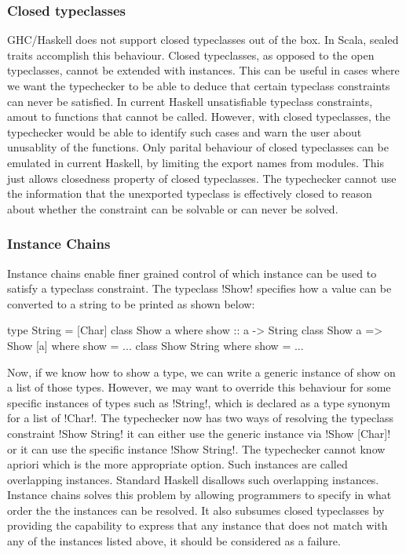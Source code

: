 \documentclass[manuscript,screen,nonacm]{acmart}
\begin{document}
\subsubsection{Closed typeclasses}
GHC/Haskell does not support closed typeclasses out of the box. In Scala, sealed traits accomplish this behaviour. Closed typeclasses, as opposed to the open typeclasses, cannot be extended with instances. This can be useful in cases where we want the typechecker to be able to deduce that certain typeclass constraints can never be satisfied. In current Haskell unsatisfiable typeclass constraints, amout to functions that cannot be called. However, with closed typeclasses, the typechecker would be able to identify such cases and warn the user about unusablity of the functions. Only parital behaviour of closed typeclasses can be emulated in current Haskell, by limiting the export names from modules. This just allows closedness property of closed typeclasses. The typechecker cannot use the information that the unexported typeclass is effectively closed to reason about whether the constraint can be solvable or can never be solved.

\subsubsection{Instance Chains}
Instance chains\cite{morris_instance_2010} enable finer grained control of which instance can be used to satisfy a typeclass constraint. The typeclass !Show! specifies how a value can be converted to a string to be printed as shown below:

\begin{CenteredBox}
\begin{code}
type String = [Char]
class Show a where show :: a -> String
class Show a => Show [a] where show = ...
class Show String where show = ...
\end{code}
\end{CenteredBox}

Now, if we know how to show a type, we can write a generic instance of show on a list of those types. However, we may want to override this behaviour for some specific instances of types such as !String!, which is declared as a type synonym for a list of !Char!. The typechecker now has two ways of resolving the typeclass constraint !Show String! it can either use the generic instance via !Show [Char]! or it can use the specific instance !Show String!. The typechecker cannot know apriori which is the more appropriate option. Such instances are called overlapping instances. Standard Haskell disallows such overlapping instances. Instance chains solves this problem by allowing programmers to specify in what order the the instances can be resolved. It also subsumes closed typeclasses by providing the capability to express that any instance that does not match with any of the instances listed above, it should be considered as a failure.
\end{document}
